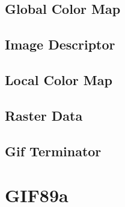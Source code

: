 \documentclass{report}
\begin{document}
\section{Global Color Map}
\section{Image Descriptor}
\section{Local Color Map}
\section{Raster Data}
\section{Gif Terminator}

\chapter{GIF89a}

\appendix
\end{document}
